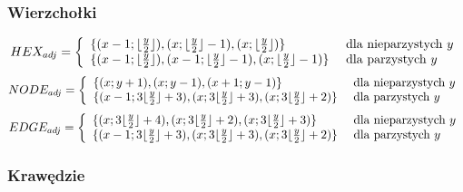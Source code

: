 \documentclass[a4paper,12pt]{article}
\begin{document}
\subsubsection{Wierzchołki}
\begin{equation}
  HEX_{adj}=
  \left\{
    \begin{array}{l l}
      \{
      (x-1; \lfloor\frac{y}{2}\rfloor),
      (x; \lfloor\frac{y}{2}\rfloor-1),
      (x; \lfloor\frac{y}{2}\rfloor)
      \} & \mbox{ dla nieparzystych $y$} \\
      \{
      (x-1; \lfloor\frac{y}{2}\rfloor),
      (x-1; \lfloor\frac{y}{2}\rfloor-1),
      (x; \lfloor\frac{y}{2}\rfloor-1)
      \} & \mbox{ dla parzystych $y$} \\
    \end{array} \right.
  \label{nodehexes}
\end{equation}
\begin{equation}
  NODE_{adj}=
  \left\{
    \begin{array}{l l}
      \{
      (x; y+1),
      (x; y-1),
      (x+1; y-1)
      \} & \mbox{ dla nieparzystych $y$} \\
      \{
      (x-1; 3\lfloor\frac{y}{2}\rfloor+3),
      (x; 3\lfloor\frac{y}{2}\rfloor+3),
      (x; 3\lfloor\frac{y}{2}\rfloor+2)
      \} & \mbox{ dla parzystych $y$} \\
    \end{array} \right.
  \label{nodenodes}
\end{equation}
\begin{equation}
  EDGE_{adj}=
  \left\{
    \begin{array}{l l}
      \{
      (x; 3\lfloor\frac{y}{2}\rfloor+4),
      (x; 3\lfloor\frac{y}{2}\rfloor+2),
      (x; 3\lfloor\frac{y}{2}\rfloor+3)
      \} & \mbox{ dla nieparzystych $y$} \\
      \{
      (x-1; 3\lfloor\frac{y}{2}\rfloor+3),
      (x; 3\lfloor\frac{y}{2}\rfloor+3),
      (x; 3\lfloor\frac{y}{2}\rfloor+2)
      \} & \mbox{ dla parzystych $y$} \\
    \end{array} \right.
  \label{nodenodes}
\end{equation}

\subsubsection{Krawędzie}
\end{document}
